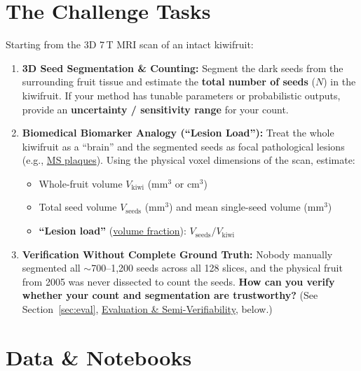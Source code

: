 \documentclass[10pt,a4paper]{article}
\begin{document}
\clearpage
\section{The Challenge Tasks}

Starting from the 3D 7\,T MRI scan of an intact kiwifruit:

\begin{enumerate}
    \item \textbf{3D Seed Segmentation \& Counting:} Segment the dark seeds from the surrounding fruit tissue and estimate the \textbf{total number of seeds} ($N$) in the kiwifruit. If your method has tunable parameters or probabilistic outputs, provide an \textbf{uncertainty / sensitivity range} for your count.
    \item \textbf{Biomedical Biomarker Analogy (``Lesion Load''):} Treat the whole kiwifruit as a ``brain'' and the segmented seeds as focal pathological lesions (e.g., \href{https://pubmed.ncbi.nlm.nih.gov/23084503/}{MS plaques}). Using the physical voxel dimensions of the scan, estimate:
    \begin{itemize}
        \item Whole-fruit volume $V_{\text{kiwi}}$ ($\text{mm}^3$ or $\text{cm}^3$)
        \item Total seed volume $V_{\text{seeds}}$ ($\text{mm}^3$) and mean single-seed volume ($\text{mm}^3$)
        \item \textbf{``Lesion load''} (\href{https://journals.plos.org/plosone/article?id=10.1371/journal.pone.0120754}{volume fraction}): $V_{\text{seeds}} / V_{\text{kiwi}}$
    \end{itemize}
    \item \textbf{Verification Without Complete Ground Truth:} Nobody manually segmented all $\sim$700--1,200 seeds across all 128 slices, and the physical fruit from 2005 was never dissected to count the seeds. \textbf{How can you verify whether your count and segmentation are trustworthy?} (See Section~\ref{sec:eval}, \hyperref[sec:eval]{Evaluation \& Semi-Verifiability}, below.)
\end{enumerate}

\section{Data \& Notebooks}
\end{document}
